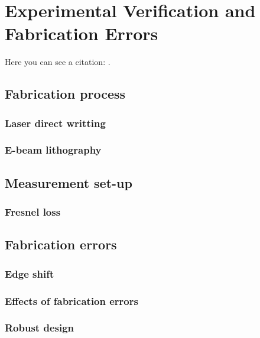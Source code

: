 \cleardoublepage
\chapter{Experimental Verification and Fabrication Errors}
Here you can see a citation: \cite{atc13}.

\lipsum[7]

\section{Fabrication process}
\subsection{Laser direct writting}
\subsection{E-beam lithography}
\lipsum[3]
\section{Measurement set-up}
\subsection{Fresnel loss}
\section{Fabrication errors}
\subsection{Edge shift}
\subsection{Effects of fabrication errors}
\subsection{Robust design}
\lipsum[3]
